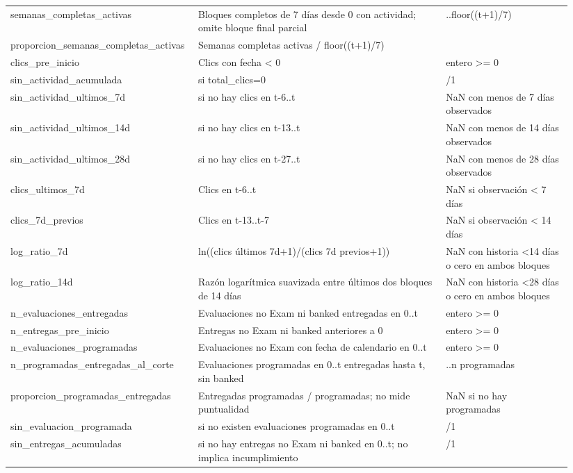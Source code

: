 \begin{longtable}{>{\raggedright\arraybackslash}p{0.29\linewidth}>{\raggedright\arraybackslash}p{0.43\linewidth}>{\raggedright\arraybackslash}p{0.22\linewidth}}
semanas\_\allowbreak{}completas\_\allowbreak{}activas & Bloques completos de 7 días desde 0 con actividad; omite bloque final parcial & 0..floor((t+1)/7) \\
proporcion\_\allowbreak{}semanas\_\allowbreak{}completas\_\allowbreak{}activas & Semanas completas activas / floor((t+1)/7) & [0,1] \\
clics\_\allowbreak{}pre\_\allowbreak{}inicio & Clics con fecha < 0 & entero >= 0 \\
sin\_\allowbreak{}actividad\_\allowbreak{}acumulada & 1 si total\_\allowbreak{}clics=0 & 0/1 \\
sin\_\allowbreak{}actividad\_\allowbreak{}ultimos\_\allowbreak{}7d & 1 si no hay clics en t-6..t & NaN con menos de 7 días observados \\
sin\_\allowbreak{}actividad\_\allowbreak{}ultimos\_\allowbreak{}14d & 1 si no hay clics en t-13..t & NaN con menos de 14 días observados \\
sin\_\allowbreak{}actividad\_\allowbreak{}ultimos\_\allowbreak{}28d & 1 si no hay clics en t-27..t & NaN con menos de 28 días observados \\
clics\_\allowbreak{}ultimos\_\allowbreak{}7d & Clics en t-6..t & NaN si observación < 7 días \\
clics\_\allowbreak{}7d\_\allowbreak{}previos & Clics en t-13..t-7 & NaN si observación < 14 días \\
log\_\allowbreak{}ratio\_\allowbreak{}7d & ln((clics últimos 7d+1)/(clics 7d previos+1)) & NaN con historia <14 días o cero en ambos bloques \\
log\_\allowbreak{}ratio\_\allowbreak{}14d & Razón logarítmica suavizada entre últimos dos bloques de 14 días & NaN con historia <28 días o cero en ambos bloques \\
n\_\allowbreak{}evaluaciones\_\allowbreak{}entregadas & Evaluaciones no Exam ni banked entregadas en 0..t & entero >= 0 \\
n\_\allowbreak{}entregas\_\allowbreak{}pre\_\allowbreak{}inicio & Entregas no Exam ni banked anteriores a 0 & entero >= 0 \\
n\_\allowbreak{}evaluaciones\_\allowbreak{}programadas & Evaluaciones no Exam con fecha de calendario en 0..t & entero >= 0 \\
n\_\allowbreak{}programadas\_\allowbreak{}entregadas\_\allowbreak{}al\_\allowbreak{}corte & Evaluaciones programadas en 0..t entregadas hasta t, sin banked & 0..n programadas \\
proporcion\_\allowbreak{}programadas\_\allowbreak{}entregadas & Entregadas programadas / programadas; no mide puntualidad & NaN si no hay programadas \\
sin\_\allowbreak{}evaluacion\_\allowbreak{}programada & 1 si no existen evaluaciones programadas en 0..t & 0/1 \\
sin\_\allowbreak{}entregas\_\allowbreak{}acumuladas & 1 si no hay entregas no Exam ni banked en 0..t; no implica incumplimiento & 0/1 \\
\end{longtable}\endgroup
